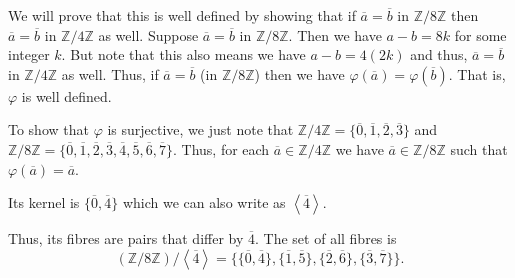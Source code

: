 \documentclass[12 pt, letterpaper]{hmcpset}
\begin{document}
\begin{solution}
	We will prove that this is well defined by showing that if $\overline{a} = \overline{b}$ in $\mathbb{Z} / 8 \mathbb{Z}$ then $\overline{a} = \overline{b}$ in $\mathbb{Z} / 4 \mathbb{Z}$ as well. Suppose $\overline{a} = \overline{b}$ in $\mathbb{Z} / 8 \mathbb{Z}$. Then we have $a - b = 8k$ for some integer $k$. But note that this also means we have $a - b = 4(2k)$ and thus, $\overline{a} = \overline{b}$ in $\mathbb{Z}/4\mathbb{Z}$ as well. Thus, if $\overline{a} = \overline{b}$ (in $\mathbb{Z}/8 \mathbb{Z}$) then we have $\varphi(\overline{a}) = \varphi(\overline{b})$. That is, $\varphi$ is well defined. 

	To show that $\varphi$ is surjective, we just note that $\mathbb{Z}/4\mathbb{Z} = \{ \overline{0}, \overline{1}, \overline{2}, \overline{3} \}$ and $\mathbb{Z}/8 \mathbb{Z} = \{ \overline{0}, \overline{1}, \overline{2}, \overline{3}, \overline{4}, \overline{5}, \overline{6}, \overline{7} \}$. Thus, for each $\overline{a} \in \mathbb{Z}/4 \mathbb{Z}$ we have $\overline{a} \in \mathbb{Z}/ 8 \mathbb{Z}$ such that $\varphi(\overline{a}) = \overline{a}$. 

	Its kernel is $\{ \overline{0}, \overline{4} \}$ which we can also write as $\left < \overline{4} \right >$. 

	Thus, its fibres are pairs that differ by $\overline{4}$. The set of all fibres is
	\[
		(\mathbb{Z}/8\mathbb{Z})/\left < \overline{4} \right > = \{ \{ \overline{0}, \overline{4} \}, \{ \overline{1}, \overline{5} \}, \{ \overline{2}, \overline{6} \}, \{ \overline{3}, \overline{7} \} \}.
	\]
\end{solution}
\end{document}
